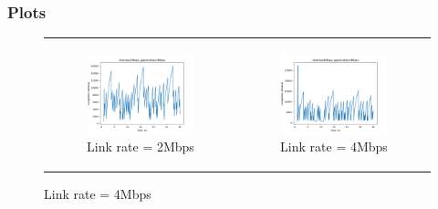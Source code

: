 \documentclass[11pt]{article}
\begin{document}
\subsubsection{Plots}\label{sec:channel}
\begin{figure}[H]
  \centering
  \begin{tabular}[c]{cc}
    \begin{subfigure}[c]{0.5\textwidth}
      \centering
      \includegraphics[width=\textwidth]{Q2/outputs/channel2Mbps_application2Mbps.png}
      \caption{Link rate = 2Mbps}
    \end{subfigure}&

    \begin{subfigure}[c]{0.5\textwidth}
      \centering
      \includegraphics[width=\textwidth]{Q2/outputs/channel4Mbps_application2Mbps.png}
      \caption{Link rate = 4Mbps}
    \end{subfigure}\\


\end{tabular}
\end{figure}
\end{document}

